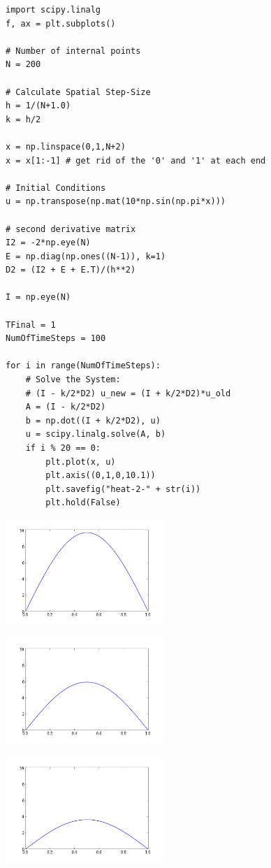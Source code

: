 \documentclass[12pt,fleqn]{article}\usepackage{../../common}
\begin{document}
\begin{verbatim}
import scipy.linalg
f, ax = plt.subplots()

# Number of internal points
N = 200

# Calculate Spatial Step-Size
h = 1/(N+1.0)
k = h/2

x = np.linspace(0,1,N+2)
x = x[1:-1] # get rid of the '0' and '1' at each end

# Initial Conditions
u = np.transpose(np.mat(10*np.sin(np.pi*x)))

# second derivative matrix
I2 = -2*np.eye(N)
E = np.diag(np.ones((N-1)), k=1)
D2 = (I2 + E + E.T)/(h**2)

I = np.eye(N)

TFinal = 1
NumOfTimeSteps = 100

for i in range(NumOfTimeSteps):
    # Solve the System: 
    # (I - k/2*D2) u_new = (I + k/2*D2)*u_old
    A = (I - k/2*D2)
    b = np.dot((I + k/2*D2), u)
    u = scipy.linalg.solve(A, b)
    if i % 20 == 0:
        plt.plot(x, u)
        plt.axis((0,1,0,10.1))
        plt.savefig("heat-2-" + str(i))
        plt.hold(False)
\end{verbatim}

\includegraphics[height=4cm]{heat-2-0.png}

\includegraphics[height=4cm]{heat-2-20.png}

\includegraphics[height=4cm]{heat-2-40.png}
\end{document}

